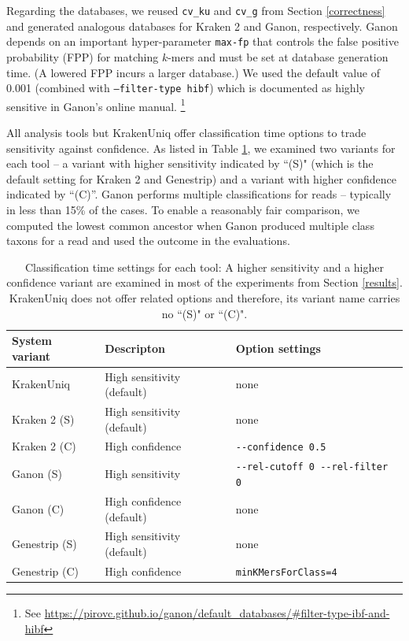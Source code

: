 \documentclass[pdflatex,sn-vancouver-num]{sn-jnl}
\begin{document}
Regarding the databases, we reused \texttt{cv\_ku} and \texttt{cv\_g} from Section \ref{correctness} and generated analogous databases for Kraken 2 and Ganon, respectively. 
Ganon depends on an important hyper-parameter \texttt{max-fp} that controls the false positive probability (FPP) for matching $k$-mers and must be set at database generation time. (A lowered FPP incurs a larger database.) We used the default value of 0.001 (combined with \texttt{--filter-type hibf}) which is documented as highly sensitive in Ganon's online manual.
\footnote{See \url{https://pirovc.github.io/ganon/default_databases/\#filter-type-ibf-and-hibf}}

All analysis tools but KrakenUniq offer classification time options to trade sensitivity against confidence. As listed in Table \ref{toolvariants}, we examined two variants for each tool -- a variant with higher sensitivity indicated by ``(S)" (which is the default setting for Kraken 2 and Genestrip) and a variant with higher confidence indicated by ``(C)''.
Ganon performs multiple classifications for reads -- typically in less than 15\% of the cases. To enable a reasonably fair comparison, we computed the lowest common ancestor when Ganon produced multiple class taxons for a read and used the outcome in the evaluations.

        \begin{table}[h]
        \centering
        \begin{tabular}{l|l|l}
        \textbf{System variant} & \textbf{Descripton} & \textbf{Option settings} \\ 
        \hline
        KrakenUniq & High sensitivity (default) & none \\
        Kraken 2 (S) & High sensitivity (default) & none \\
        Kraken 2 (C) & High confidence & \verb|--confidence 0.5| \\
        Ganon (S) & High sensitivity & \verb|--rel-cutoff 0 --rel-filter 0| \\
        Ganon (C) & High confidence (default) & none \\
        Genestrip (S) & High sensitivity (default) & none \\
        Genestrip (C) & High confidence  & \verb|minKMersForClass=4| \\
        \end{tabular}
\caption{Classification time settings for each tool: A higher sensitivity and a higher confidence variant are examined in most of the experiments from Section \ref{results}. KrakenUniq does not offer related options and therefore, its variant name carries no ``(S)" or ``(C)". }
\label{toolvariants}
    \end{table}
\end{document}
